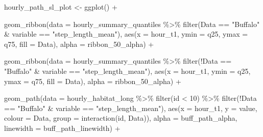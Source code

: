 \documentclass[
  letterpaper,
  DIV=11,
  numbers=noendperiod]{scrartcl}
\newenvironment{Shaded}{\begin{snugshade}}{\end{snugshade}}
\newcommand{\AttributeTok}[1]{\textcolor[rgb]{0.40,0.45,0.13}{#1}}
\newcommand{\DecValTok}[1]{\textcolor[rgb]{0.68,0.00,0.00}{#1}}
\newcommand{\FunctionTok}[1]{\textcolor[rgb]{0.28,0.35,0.67}{#1}}
\newcommand{\NormalTok}[1]{\textcolor[rgb]{0.00,0.23,0.31}{#1}}
\newcommand{\OtherTok}[1]{\textcolor[rgb]{0.00,0.23,0.31}{#1}}
\newcommand{\SpecialCharTok}[1]{\textcolor[rgb]{0.37,0.37,0.37}{#1}}
\newcommand{\StringTok}[1]{\textcolor[rgb]{0.13,0.47,0.30}{#1}}
\begin{document}
\begin{Shaded}
\begin{Highlighting}[]
\NormalTok{hourly\_path\_sl\_plot }\OtherTok{\textless{}{-}} \FunctionTok{ggplot}\NormalTok{() }\SpecialCharTok{+}

  \FunctionTok{geom\_ribbon}\NormalTok{(}\AttributeTok{data =}\NormalTok{ hourly\_summary\_quantiles }\SpecialCharTok{\%\textgreater{}\%} 
                \FunctionTok{filter}\NormalTok{(Data }\SpecialCharTok{==} \StringTok{"Buffalo"} \SpecialCharTok{\&}\NormalTok{ variable }\SpecialCharTok{==} \StringTok{"step\_length\_mean"}\NormalTok{),}
              \FunctionTok{aes}\NormalTok{(}\AttributeTok{x =}\NormalTok{ hour\_t1, }\AttributeTok{ymin =}\NormalTok{ q25, }\AttributeTok{ymax =}\NormalTok{ q75, }\AttributeTok{fill =}\NormalTok{ Data),}
              \AttributeTok{alpha =}\NormalTok{ ribbon\_50\_alpha) }\SpecialCharTok{+}

  \FunctionTok{geom\_ribbon}\NormalTok{(}\AttributeTok{data =}\NormalTok{ hourly\_summary\_quantiles }\SpecialCharTok{\%\textgreater{}\%} 
                \FunctionTok{filter}\NormalTok{(}\SpecialCharTok{!}\NormalTok{Data }\SpecialCharTok{==} \StringTok{"Buffalo"} \SpecialCharTok{\&}\NormalTok{ variable }\SpecialCharTok{==} \StringTok{"step\_length\_mean"}\NormalTok{),}
              \FunctionTok{aes}\NormalTok{(}\AttributeTok{x =}\NormalTok{ hour\_t1, }\AttributeTok{ymin =}\NormalTok{ q25, }\AttributeTok{ymax =}\NormalTok{ q75, }\AttributeTok{fill =}\NormalTok{ Data),}
              \AttributeTok{alpha =}\NormalTok{ ribbon\_50\_alpha) }\SpecialCharTok{+}
  
  \FunctionTok{geom\_path}\NormalTok{(}\AttributeTok{data =}\NormalTok{ hourly\_habitat\_long }\SpecialCharTok{\%\textgreater{}\%} \FunctionTok{filter}\NormalTok{(id }\SpecialCharTok{\textless{}} \DecValTok{10}\NormalTok{) }\SpecialCharTok{\%\textgreater{}\%} 
              \FunctionTok{filter}\NormalTok{(}\SpecialCharTok{!}\NormalTok{Data }\SpecialCharTok{==} \StringTok{"Buffalo"} \SpecialCharTok{\&}\NormalTok{ variable }\SpecialCharTok{==} \StringTok{"step\_length\_mean"}\NormalTok{),}
                 \FunctionTok{aes}\NormalTok{(}\AttributeTok{x =}\NormalTok{ hour\_t1, }\AttributeTok{y =}\NormalTok{ value, }\AttributeTok{colour =}\NormalTok{ Data, }\AttributeTok{group =} \FunctionTok{interaction}\NormalTok{(id, Data)),}
                 \AttributeTok{alpha =}\NormalTok{ buff\_path\_alpha,}
              \AttributeTok{linewidth =}\NormalTok{ buff\_path\_linewidth) }\SpecialCharTok{+}
  

\end{Highlighting}
\end{Shaded}
\end{document}
